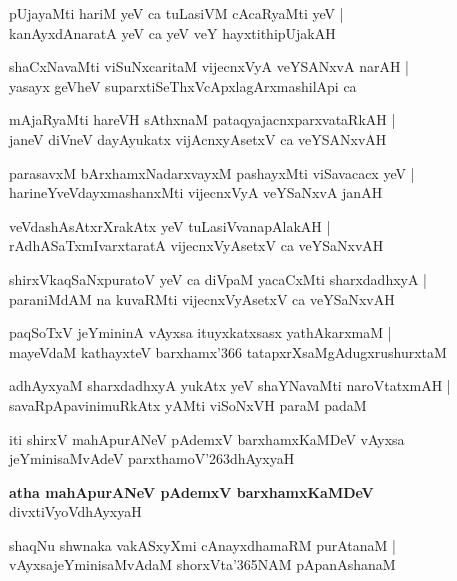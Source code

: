 \begin{shloka}
pUjayaMti hariM yeV ca tuLasiVM cAcaRyaMti yeV |\\
kanAyxdAnaratA yeV ca yeV veY hayxtithipUjakAH 
\end{shloka}

\begin{shloka}
shaCxNavaMti viSuNxcaritaM vijecnxVyA veYSANxvA narAH |\\
yasayx geVheV suparxtiSeThxVcApxlagArxmashilApi ca
\end{shloka}

\begin{shloka}
mAjaRyaMti hareVH sAthxnaM pataqyajacnxparxvataRkAH |\\
janeV diVneV dayAyukatx vijAcnxyAsetxV ca veYSANxvAH
\end{shloka}

\begin{shloka}
parasavxM bArxhamxNadarxvayxM pashayxMti viSavacacx yeV |\\
harineYveVdayxmashanxMti vijecnxVyA veYSaNxvA janAH
\end{shloka}

\begin{shloka}
veVdashAsAtxrXrakAtx yeV tuLasiVvanapAlakAH |\\
rAdhASaTxmIvarxtaratA vijecnxVyAsetxV ca veYSaNxvAH
\end{shloka}

\begin{shloka}
shirxVkaqSaNxpuratoV yeV ca diVpaM yacaCxMti sharxdadhxyA |\\
paraniMdAM na kuvaRMti vijecnxVyAsetxV ca veYSaNxvAH
\end{shloka}

\begin{shloka}
paqSoTxV jeYmininA vAyxsa ituyxkatxsasx yathAkarxmaM |\\
mayeVdaM kathayxteV barxhamx\char'366 tatapxrXsaMgAdugxrushurxtaM
\end{shloka}

\begin{shloka}
adhAyxyaM sharxdadhxyA yukAtx yeV shaYNavaMti naroVtatxmAH |\\
savaRpApavinimuRkAtx yAMti viSoNxVH paraM padaM
\end{shloka}
iti shirxV mahApurANeV pAdemxV barxhamxKaMDeV vAyxsa jeYminisaMvAdeV parxthamoV\char'263dhAyxyaH

\begin{center}
\textbf{\large atha mahApurANeV pAdemxV barxhamxKaMDeV}\\
divxtiVyoVdhAyxyaH
\end{center}
\setcounter{shloka}{0}
\begin{shloka}
shaqNu shwnaka vakASxyXmi cAnayxdhamaRM purAtanaM |\\
vAyxsajeYminisaMvAdaM shorxVta\char'365NAM pApanAshanaM
\end{shloka}

